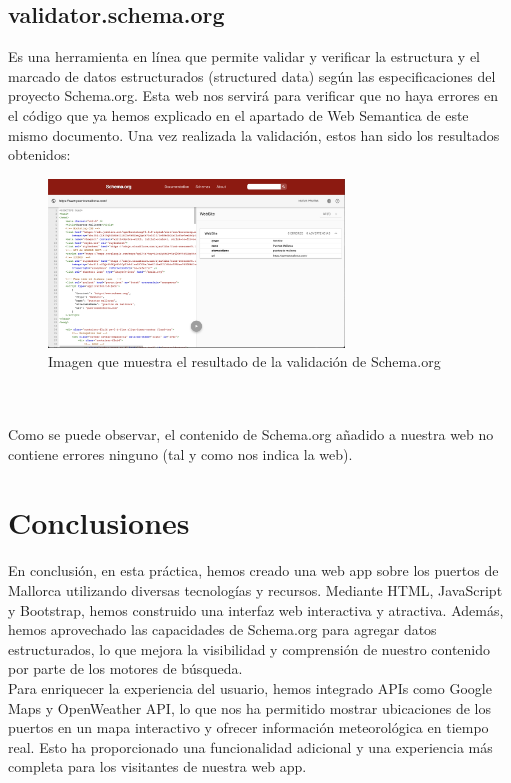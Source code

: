 \documentclass{article}
\begin{document}
\subsection{validator.schema.org}
Es una herramienta en línea que permite validar y verificar la estructura y el marcado de datos estructurados (structured data) según las especificaciones del proyecto Schema.org. Esta web nos servirá para verificar que no haya errores en el código que ya hemos explicado en el apartado de Web Semantica de este mismo documento. Una vez realizada la validación, estos han sido los resultados obtenidos:
\begin{figure}[ht]
    \centering
    \includegraphics[width=0.7\textwidth]{images/schema.png}
    \caption{Imagen que muestra el resultado de la validación de Schema.org}
\end{figure}\\\\
Como se puede observar, el contenido de Schema.org añadido a nuestra web no contiene errores ninguno (tal y como nos indica la web).
\newpage
\section{Conclusiones}
En conclusión, en esta práctica, hemos creado una web app sobre los puertos de Mallorca utilizando diversas tecnologías y recursos. Mediante HTML, JavaScript y Bootstrap, hemos construido una interfaz web interactiva y atractiva. Además, hemos aprovechado las capacidades de Schema.org para agregar datos estructurados, lo que mejora la visibilidad y comprensión de nuestro contenido por parte de los motores de búsqueda.\\

\noindent Para enriquecer la experiencia del usuario, hemos integrado APIs como Google Maps y OpenWeather API, lo que nos ha permitido mostrar ubicaciones de los puertos en un mapa interactivo y ofrecer información meteorológica en tiempo real. Esto ha proporcionado una funcionalidad adicional y una experiencia más completa para los visitantes de nuestra web app.\\
\end{document}

